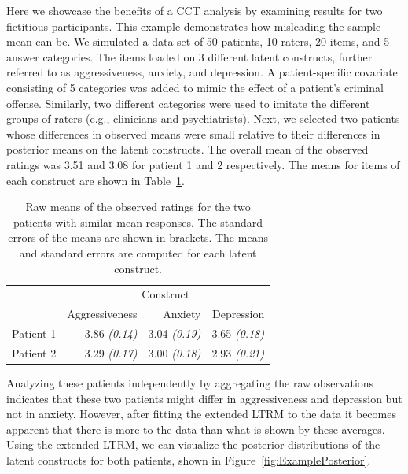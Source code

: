 \documentclass[a4paper]{article}
\newcommand{\SE}[1]{\emph{({#1})}}
\begin{document}
Here we showcase the benefits of a CCT analysis by examining results for two fictitious participants. This example demonstrates how misleading the sample mean can be. We simulated a data set of 50 patients, 10 raters, 20 items, and 5 answer categories. The items loaded on 3 different latent constructs, further referred to as aggressiveness, anxiety, and depression. A patient-specific covariate consisting of 5 categories was added to mimic the effect of a patient's criminal offense. Similarly, two different categories were used to imitate the different groups of raters (e.g., clinicians and psychiatrists). Next, we selected two patients whose differences in observed means were small relative to their differences in posterior means on the latent constructs. The overall mean of the observed ratings was 3.51 and 3.08 for patient 1 and 2 respectively. The means for items of each construct are shown in Table~\ref{tb:rawMeans}.
\begin{table}[!ht]
	\centering
	\caption{Raw means of the observed ratings for the two patients with similar mean responses. The standard errors of the means are shown in brackets. The means and standard errors are computed for each latent construct.}%
	\label{tb:rawMeans}
	\begin{tabular}{rrrr}
		\toprule
		\multicolumn{1}{c}{} & \multicolumn{3}{c}{Construct}\\%
		\cmidrule[0.4pt]{2-4}
		& Aggressiveness & Anxiety & Depression\\%
		\midrule
		Patient 1 & 3.86 \SE{0.14} & 3.04 \SE{0.19} & 3.65 \SE{0.18} \\%
		Patient 2 & 3.29 \SE{0.17} & 3.00 \SE{0.18} & 2.93 \SE{0.21} \\%
		\bottomrule
	\end{tabular}
\end{table}
Analyzing these patients independently by aggregating the raw observations indicates that these two patients might differ in aggressiveness and depression but not in anxiety. However, after fitting the extended LTRM to the data it becomes apparent that there is more to the data than what is shown by these averages. Using the extended LTRM, we can visualize the posterior distributions of the latent constructs for both patients, shown in Figure~\ref{fig:ExamplePosterior}.
\end{document}
